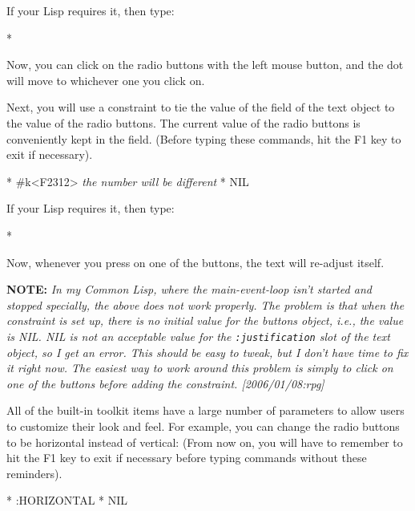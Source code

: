 If your Lisp requires it, then type:
\begin{programexample}
* 
\end{programexample}

Now, you can click on the radio buttons with the left mouse button, and the
dot will move to whichever one you click on.

Next, you will use a constraint to tie the value of the 
field of the text object to the value of the radio buttons.  The current
value of the radio buttons is conveniently kept in the  field.
(Before typing these commands, hit the F1 key to exit  
if necessary).

\begin{programexample}
* 
\#k<F2312>   {\it the number will be different}
* 
NIL
\end{programexample}
If your Lisp requires it, then type:
\begin{programexample}
* 
\end{programexample}

Now, whenever you press on one of the buttons, the text will re-adjust
itself.

\textbf{NOTE:}
\textit{In my Common Lisp, where the main-event-loop isn't started and
stopped specially, the above does not work properly.  The problem is
that when the constraint is set up, there is no initial value for the
buttons object, i.e., the value is NIL.  NIL is not an acceptable
value for the \texttt{:justification} slot of the text object, so I
get an error.  This should be easy to tweak, but I don't have time to
fix it right now.  The easiest way to work around this problem is
simply to click on one of the buttons before adding the constraint. [2006/01/08:rpg]}

All of the built-in toolkit items have a large number of parameters to
allow users to customize their look and feel.  For example, you can change
the radio buttons to be horizontal instead of vertical:
(From now on, you will have to remember to hit the F1 key to exit
 if necessary before typing commands without these
reminders).
\begin{programexample}
* 
:HORIZONTAL
* 
NIL
\end{programexample}


